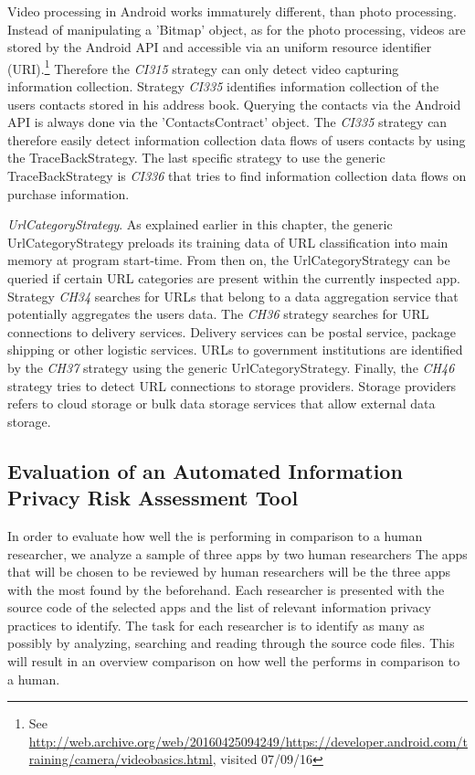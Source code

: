 Video processing in Android works immaturely different, than photo processing.
Instead of manipulating a 'Bitmap' object, as for the photo processing, videos are stored by the Android API and accessible via an uniform resource identifier (\acs{URI}).\footnote{\raggedright See \url{http://web.archive.org/web/20160425094249/https://developer.android.com/training/camera/videobasics.html}, visited 07/09/16}
Therefore the \textit{CI315} strategy can only detect video capturing information collection.
Strategy \textit{CI335} identifies information collection of the users contacts stored in his address book.
Querying the contacts via the Android API is always done via the 'ContactsContract' object.
The \textit{CI335} strategy can therefore easily detect information collection data flows of users contacts by using the TraceBackStrategy.
The last specific strategy to use the generic TraceBackStrategy is \textit{CI336} that tries to find information collection data flows on purchase information.

\textit{UrlCategoryStrategy}.
As explained earlier in this chapter, the generic UrlCategoryStrategy preloads its training data of \acs{URL} classification into main memory at program start-time.
From then on, the UrlCategoryStrategy can be queried if certain URL categories are present within the currently inspected app. 
Strategy \textit{CH34} searches for URLs that belong to a data aggregation service that potentially aggregates the users data.
The \textit{CH36} strategy searches for URL connections to delivery services.
Delivery services can be postal service, package shipping or other logistic services.
URLs to government institutions are identified by the \textit{CH37} strategy using the generic UrlCategoryStrategy.
Finally, the \textit{CH46} strategy tries to detect URL connections to storage providers.
Storage providers refers to cloud storage or bulk data storage services that allow external data storage.

\subsection{Evaluation of an Automated Information Privacy Risk Assessment Tool}\label{chapter:evaluationMethods}

In order to evaluate how well the \aiprat is performing in comparison to a human researcher, we analyze a sample of three apps by two human researchers
The apps that will be chosen to be reviewed by human researchers will be the three apps with the most \ipr found by the \aiprat beforehand.
Each researcher is presented with the source code of the selected apps and the list of relevant information privacy practices to identify.
The task for each researcher is to identify as many \ipp as possibly by analyzing, searching and reading through the source code files. 
This will result in an overview comparison on how well the \aiprat performs in comparison to a human.


